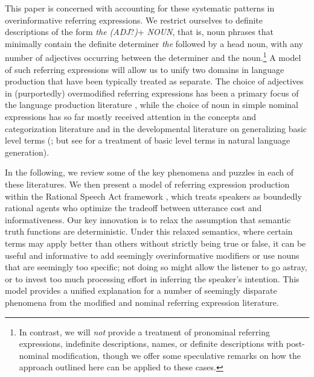 \documentclass[11pt]{article}
\newcommand{\cg}[1]{\textcolor{Purple}{[cg: #1]}}
\begin{document}
This paper is concerned with accounting for these systematic patterns in overinformative referring expressions. We restrict ourselves to definite descriptions of the form \emph{the (ADJ}?\emph{)}+ \emph{NOUN}, that is, noun phrases that minimally contain the definite determiner \emph{the} followed by a head noun, with any number of adjectives occurring between the determiner and the noun.\footnote{In contrast, we will \emph{not} provide a treatment of pronominal referring expressions, indefinite descriptions, names, or definite descriptions with post-nominal modification, though we offer some speculative remarks on how the approach outlined here can be applied to these cases.} 
A model of such referring expressions will allow us to unify two domains in language production that have been typically treated as separate. %
The choice of adjectives in (purportedly) overmodified referring expressions has been a primary focus of the language production literature
\cite{herrmann1976, Pechmann1989, nadig2002, sedivy2003a, Maes2004, Engelhardt2006, Arts2011, Koolen2011, rubiofernandez2016}, while the choice of noun in simple nominal expressions has so far mostly received attention in the concepts and categorization literature \cite{Rosch1973, Rosch1976} and in the developmental literature on generalizing basic level terms (; but see  for a treatment of basic level terms in natural language generation). %

In the following, we review some of the key phenomena and puzzles in each of these literatures. We then present a model of referring expression production within the Rational Speech Act framework \cite{frank2012, goodman2016, FrankeJaeger2016}, which treats speakers as boundedly rational agents who optimize the tradeoff between utterance cost and informativeness. Our key innovation is to relax the assumption that semantic truth functions are deterministic. Under this relaxed semantics, where certain terms may apply better than others without strictly being true or false, it can be useful and informative to add seemingly overinformative modifiers or use nouns that are seemingly too specific; not doing so might allow the listener to go astray, or to invest too much processing effort in inferring the speaker's  intention. This model provides a unified explanation for a number of seemingly disparate phenomena from the modified and nominal referring expression literature. 
\end{document}

